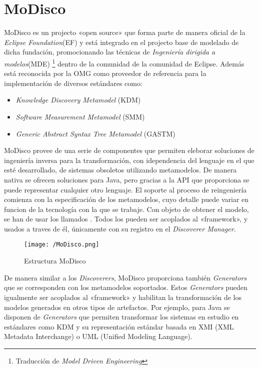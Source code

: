 {\section{MoDisco} \label{sec:MoDisco}

MoDisco es un projecto «open source» que forma parte de manera oficial de la \textit{Eclipse Foundation}(EF)\cite{EclipseFoundation} y está integrado en el
projecto base de modelado de dicha fundación, promocionando las técnicas de \textit{Ingeniería dirigida a modelos}(MDE) \footnote{Traducción de \textit{Model Driven Engineering}} dentro de la comunidad
de la comunidad de Eclipse. Además está reconocida por la OMG como proveedor de referencia para la implementación de diversos estándares como:
\begin{itemize}
 \item \textit{Knowledge Discovery Metamodel} (KDM)
 \item \textit{Software Measurement Metamodel} (SMM)
 \item \textit{Generic Abstract Syntax Tree Metamodel} (GASTM)
\end{itemize}

MoDisco provee de una serie de componentes que permiten eleborar soluciones de ingeniería inversa para la transformación, con idependencia del lenguaje en el que esté desarrollado,
de sistemas obsoletos utilizando metamodelos. De manera nativa se ofrecen soluciones para Java, pero gracias a la API que proporciona se puede representar cualquier otro lenguaje.
El soporte al proceso de reingeniería comienza con la especificación de los metamodelos, cuyo detalle puede variar en funcion de la tecnología con la que se trabaje. Con objeto de
obtener el modelo, se han de usar los llamados . Todos los  pueden ser acoplados al «framework», y usados a traves de él, únicamente
con su registro en el \textit{Discoverer Manager}.

\begin{figure}[!h]
\begin{center}
\texttt{[image: /MoDisco.png]}
\caption{Estructura MoDisco}
\label{fig:3phase-steps}
\end{center}
\end{figure}

De manera similar a los \textit{Discoverers}, MoDisco proporciona también \textit{Generators} que se corresponden con los metamodelos soportados. Estos \textit{Generators} pueden 
igualmente ser acoplados al «framework» y habilitan la transformación de los modelos generados en otros tipos de artefactos. Por ejemplo, para Java se disponen de \textit{Generators}
que permiten transformar los sistemas en estudio en estándares como KDM y su representación estándar basada en XMI (XML Metadata Interchange) o UML (Unified Modeling Language).


}
